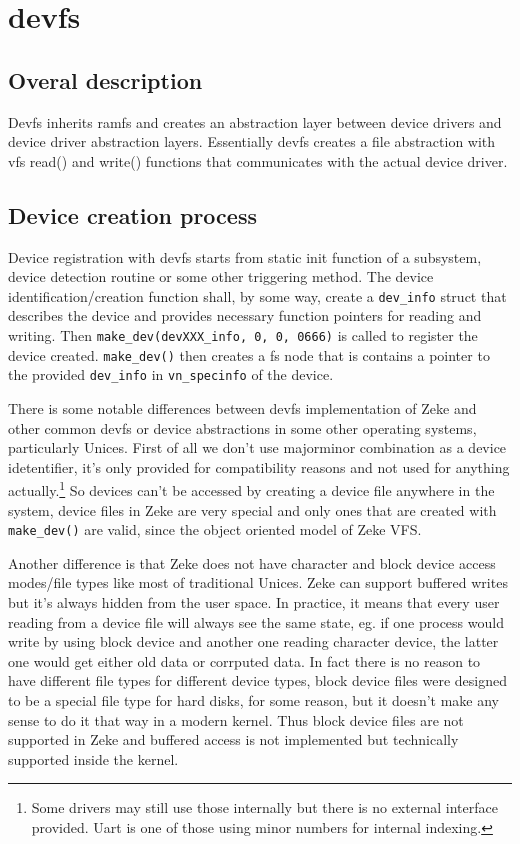 \chapter{devfs}

\section{Overal description}

Devfs inherits ramfs and creates an abstraction layer between device drivers
and device driver abstraction layers. Essentially devfs creates a file
abstraction with vfs read() and write() functions that communicates with the
actual device driver.

\section{Device creation process}

Device registration with devfs starts from static init function of a subsystem,
device detection routine or some other triggering method. The device
identification/creation function shall, by some way, create a \verb+dev_info+
struct that describes the device and provides necessary function pointers for
reading and writing. Then \verb+make_dev(devXXX_info, 0, 0, 0666)+ is called
to register the device created. \verb+make_dev()+ then creates a fs node that is
contains a pointer to the provided \verb+dev_info+ in \verb+vn_specinfo+ of the
device.

There is some notable differences between devfs implementation of Zeke and other
common devfs or device abstractions in some other operating systems,
particularly Unices. First of all we don't use majorminor combination as a
device idetentifier, it's only provided for compatibility reasons and not used
for anything actually.\footnote{Some drivers may still use those internally but
there is no external interface provided. Uart is one of those using minor
numbers for internal indexing.} So devices can't be accessed by creating
a device file anywhere in the system, device files in Zeke are very special and
only ones that are created with \verb+make_dev()+ are valid, since the object
oriented model of Zeke VFS.

Another difference is that Zeke does not have character and block device
access modes/file types like most of traditional Unices. Zeke can support
buffered writes but it's always hidden from the user space. In practice,
it means that every user reading from a device file will always see the
same state, eg. if one process would write by using block device and another
one reading character device, the latter one would get either old data or
corrputed data. In fact there is no reason to have different file types for
different device types, block device files were designed to be a special file
type for hard disks, for some reason, but it doesn't make any sense to do it
that way in a modern kernel.\cite{Kamp:rethinkdev} Thus block device files are
not supported in Zeke and buffered access is not implemented but technically
supported inside the kernel.

